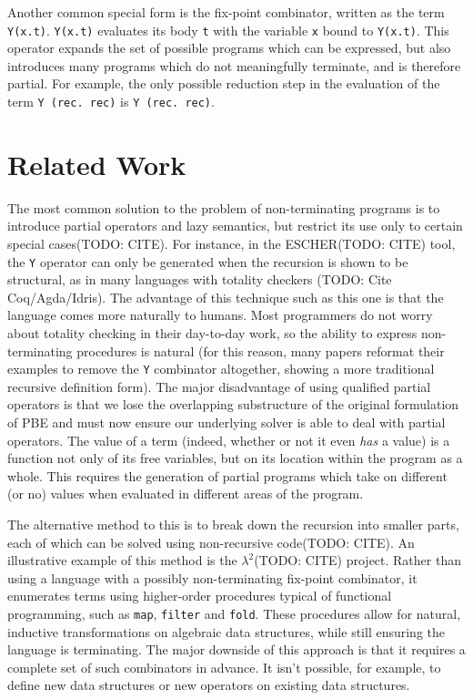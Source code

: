 \documentclass[acmsmall]{acmart}
\begin{document}
Another common special form is the fix-point combinator, written as the term \verb|Y(x.t)|. \verb|Y(x.t)| evaluates its body \verb|t| with the variable \verb|x| bound to \verb|Y(x.t)|. This operator expands the set of possible programs which can be expressed, but also introduces many programs which do not meaningfully terminate, and is therefore partial. For example, the only possible reduction step in the evaluation of the term \verb|Y (rec. rec)| is \verb|Y (rec. rec)|. 

\section{Related Work}

The most common solution to the problem of non-terminating programs is to introduce partial operators and lazy semantics, but restrict its use only to certain special cases(TODO: CITE). For instance, in the ESCHER(TODO: CITE) tool, the \verb|Y| operator can only be generated when the recursion is shown to be structural, as in many languages with totality checkers (TODO: Cite Coq/Agda/Idris). The advantage of this technique such as this one is that the language comes more naturally to humans. Most programmers do not worry about totality checking in their day-to-day work, so the ability to express non-terminating procedures is natural (for this reason, many papers reformat their examples to remove the \verb|Y| combinator altogether, showing a more traditional recursive definition form). The major disadvantage of using qualified partial operators is that we lose the overlapping substructure of the original formulation of PBE and must now ensure our underlying solver is able to deal with partial operators. The value of a term (indeed, whether or not it even \textit{has} a value) is a function not only of its free variables, but on its location within the program as a whole. This requires the generation of partial programs which take on different (or no) values when evaluated in different areas of the program.

The alternative method to this is to break down the recursion into smaller parts, each of which can be solved using non-recursive code(TODO: CITE). An illustrative example of this method is the $\lambda^2$(TODO: CITE) project. Rather than using a language with a possibly non-terminating fix-point combinator, it enumerates terms using higher-order procedures typical of functional programming, such as \texttt{map}, \texttt{filter} and \texttt{fold}. These procedures allow for natural, inductive transformations on algebraic data structures, while still ensuring the language is terminating. The major downside of this approach is that it requires a complete set of such combinators in advance. It isn't possible, for example, to define new data structures or new operators on existing data structures. 
\end{document}
